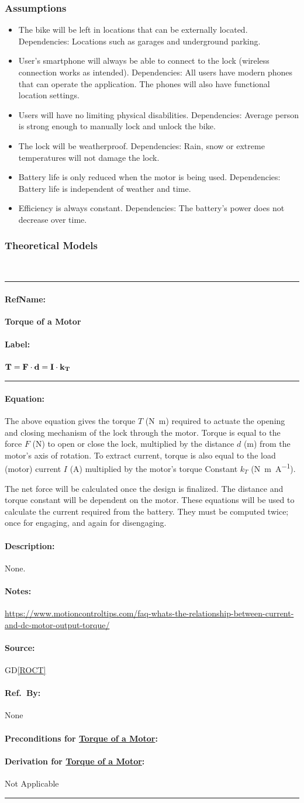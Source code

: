 \documentclass[12pt]{article}
\newcommand{\dref}[1]{GD\ref{#1}}
\newcommand{\deftheory}[9][Not Applicable]
{
\newpage
\noindent \rule{\textwidth}{0.5mm}

\paragraph{RefName: } \textbf{#2} \phantomsection 
\label{#2}

\paragraph{Label:} #3

\noindent \rule{\textwidth}{0.5mm}

\paragraph{Equation:}

#4

\paragraph{Description:}

#5

\paragraph{Notes:}

#6

\paragraph{Source:}

#7

\paragraph{Ref.\ By:}

#8

\paragraph{Preconditions for \hyperref[#2]{#2}:}
\label{#2_precond}

#9

\paragraph{Derivation for \hyperref[#2]{#2}:}
\label{#2_deriv}

#1

\noindent \rule{\textwidth}{0.5mm}

}
\begin{document}
\subsubsection{Assumptions} \label{sec_assumpt}

\begin{itemize}

\item The bike will be left in locations that can be externally located.
Dependencies: Locations such as garages and underground parking. 
\item User’s smartphone will always be able to connect to the lock (wireless connection works as intended).
Dependencies: All users have modern phones that can operate the application. The phones will also have functional location settings.  
\item Users will have no limiting physical disabilities.
Dependencies: Average person is strong enough to manually lock and unlock the bike.
\item The lock will be weatherproof.
Dependencies: Rain, snow or extreme temperatures will not damage the lock. 
\item Battery life is only reduced when the motor is being used.
Dependencies: Battery life is independent of weather and time.
\item Efficiency is always constant.
Dependencies: The battery's power does not decrease over time.

\end{itemize}

\subsubsection{Theoretical Models}\label{sec_theoretical}

~\newline

\noindent
\deftheory
{Torque of a Motor}
{
  ${\bf T = F \cdot d} = {\bf I  \cdot  k_T}$
}

{
The above equation gives the torque $T$ (\si{\newton\metre}) required to actuate the opening and closing mechanism of the lock through the motor. Torque is equal to the force $F$ (\si{\newton}) to open or close the lock, multiplied by the distance $d$ (\si{\metre}) from the motor's axis of rotation. To extract current, torque is also equal to the load (motor) current $I$ (\si{\ampere}) multiplied by the motor's torque Constant $k_T$ (\si{\newton\metre\per\ampere}).  

The net force will be calculated once the design is finalized. The distance and torque constant will be dependent on the motor. These equations will be used to calculate the current required from the battery. They must be computed twice; once for engaging, and again for disengaging. 
}
{
None.
}
{
  \url{https://www.motioncontroltips.com/faq-whats-the-relationship-between-current-and-dc-motor-output-torque/ }
}
{
  \dref{ROCT}
}
{
None
}
{}
\end{document}
